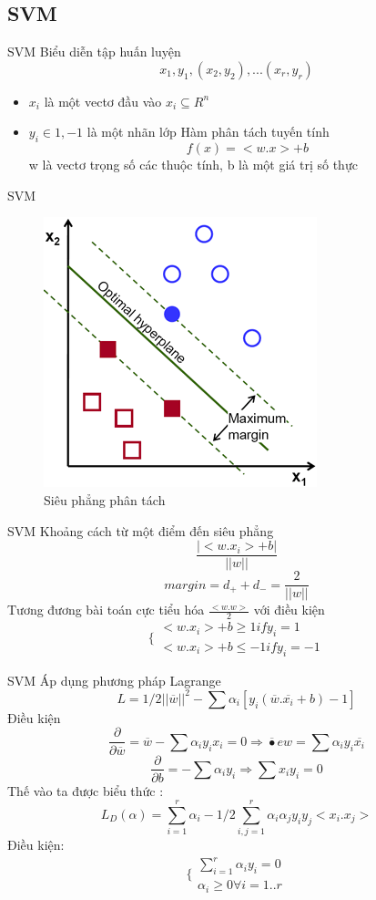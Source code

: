 \documentclass[compress]{beamer}
\begin{document}
\subsection{SVM}
\begin{frame}{SVM}
Biểu diễn tập huấn luyện 
$${x_1, y_1}, (x_2,y_2),...(x_r,y_r)$$
\begin{itemize}
\item $x_i$ là một vectơ đầu vào $x_i \subseteq R^n$
\item $y_i\in{1,-1}$ là một nhãn lớp
Hàm phân tách tuyến tính 
$$f(x)=<w.x> +b$$
w là vectơ trọng số các thuộc tính, b là một giá trị số thực\\


\end{itemize}
\end{frame}
\begin{frame}{SVM}
\begin{figure}[H]
\centering
\includegraphics[scale=3.0]{margin-svm.png}
\caption{Siêu phẳng phân tách}
\label{fig:margin-svm}
\end{figure}

\end{frame}
\begin{frame}{SVM}
Khoảng cách từ một điểm đến siêu phẳng 
$$\frac{|<w.x_i>+b|}{||w||} $$
$$margin=d_+ +d_-=\frac{2}{||w||}$$ 
Tương đương bài toán cực tiểu hóa $\frac{<w.w>}{2}$ với điều kiện 
$$ \lbrace\begin{array}{l}
 <w.x_i>+b \geq 1 if y_i=1\\ <w.x_i>+b
    \leq -1  if y_i=-1 \end{array} $$
\end{frame}
\begin{frame}{SVM}
Áp dụng phương pháp Lagrange  
$$ L= 1/2 ||\overline{w}||^2 -\sum\alpha_i[y_i(\overline{w}.\overline{x_i} +b)-1] $$
Điều kiện 
$$ \frac{ \partial}{\partial\overline{w}}
=\overline{w}- \sum \alpha_i y_i x_i=0 \Longrightarrow \overline{•}e{w}=\sum \alpha_i y_i \overline{x_i} $$
$$\frac{ \partial}{\partial b}=-\sum \alpha_i y_i \Longrightarrow \sum x_i y_i=0$$ 
Thế vào ta được biểu thức :
$$L_D(\alpha)=\sum_{i=1}^r \alpha_i-1/2 \sum_{i,j=1}^{r}\alpha_i \alpha_j y_i y_j<x_i.x_j> $$
Điều kiện:
$$\{ \begin{array}{l}
\sum_{i=1 } ^{r} \alpha_i y_i =0 \\
\alpha_i \geq 0 \forall i=1..r
\end{array}
$$
\end{frame}
\end{document}
